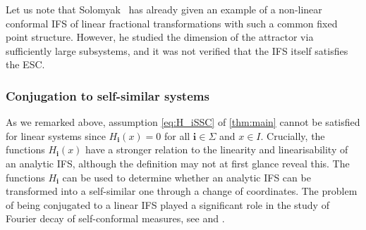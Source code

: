\documentclass[11pt,]{article}
\def\cref#1{\ref{#1}}%
\theoremstyle{definition}
\theoremstyle{remark}
\newcommand{\0}{\mathbf{0}}
\newcommand{\bi}{\mathbf{i}}
\begin{document}
Let us note that Solomyak~\cite{Solomyak24} has already given an example of a non-linear conformal
IFS of linear fractional transformations with such a common fixed point structure.
However, he studied the dimension of the attractor via sufficiently large subsystems, and it was not
verified that the IFS itself satisfies the ESC.


%
%
%
%



\subsubsection{Conjugation to self-similar systems}\label{sec:ConjLinSys}
As we remarked above, assumption \eqref{eq:H_iSSC} of \cref{thm:main} cannot be satisfied for linear systems since
$H_{\bi}(x)=0$ for all $\bi\in \Sigma$ and $x \in I$.
Crucially, the functions $H_{\bi}(x)$ have a stronger relation to the linearity and linearisability
of an analytic IFS, although the definition may not at first glance reveal this.
The functions $H_{\bi}$ can be used to determine whether an analytic IFS can be transformed into a
self-similar one through a change of coordinates.
The problem of being conjugated to a linear IFS played a significant role in the study of Fourier
decay of self-conformal measures, see
\cite{AlgomEtal_LogFourierDecaySelfConf_JLMS,BakerBanaji_PolyFourierDecay} and \cite[Corollary 1.2 part
3.]{AlgomEtal_PointwiseNormalityFDecaySelfSonf_AdvMath21}.
\end{document}
